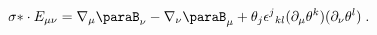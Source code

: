 \begin{equation}
\label{e5:7}
\sigma{\ast}\cdot E_{\mu \nu}=\nabla_{\mu}\paraB_{\nu}-\nabla_{\nu}\paraB_{\mu}+\theta_j\epsilon^j{}_{kl}(\partial_{\mu}\theta^k)(\partial_{\nu}\theta^l) \; .
\end{equation}

